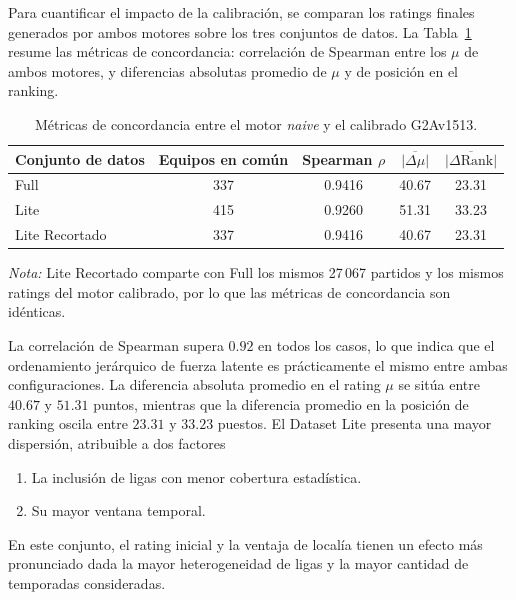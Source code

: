 Para cuantificar el impacto de la calibraci\'on, se comparan los ratings finales generados por ambos motores sobre los tres conjuntos de datos. La Tabla~\ref{tab:comparativa_concordancia_app} resume las m\'etricas de concordancia: correlaci\'on de Spearman entre los $\mu$ de ambos motores, y diferencias absolutas promedio de $\mu$ y de posici\'on en el ranking.

\begin{table}[htbp]
	\centering
	\caption{M\'etricas de concordancia entre el motor \textit{naive} y el calibrado G2Av1513.}
	\label{tab:comparativa_concordancia_app}
	\begin{tabular}{lcccc}
		\toprule
		\textbf{Conjunto de datos} & \textbf{Equipos en com\'un} & \textbf{Spearman $\rho$} & \textbf{$\overline{|\Delta \mu|}$} & \textbf{$\overline{|\Delta \text{Rank}|}$} \\
		\midrule
		Full & 337 & 0.9416 & 40.67 & 23.31 \\
		Lite & 415 & 0.9260 & 51.31 & 33.23 \\
		Lite Recortado & 337 & 0.9416 & 40.67 & 23.31 \\
		\bottomrule
	\end{tabular}
	\newline
	{\small \textit{Nota:} Lite Recortado comparte con Full los mismos 27\,067 partidos y los mismos ratings del motor calibrado, por lo que las m\'etricas de concordancia son id\'enticas.}
\end{table}

La correlaci\'on de Spearman supera $0.92$ en todos los casos, lo que indica que el ordenamiento jer\'arquico de fuerza latente es pr\'acticamente el mismo entre ambas configuraciones. La diferencia absoluta promedio en el rating $\mu$ se sit\'ua entre $40{.}67$ y $51{.}31$ puntos, mientras que la diferencia promedio en la posici\'on de ranking oscila entre $23{.}31$ y $33{.}23$ puestos. El Dataset Lite presenta una mayor dispersi\'on, atribuible a dos factores

\begin{enumerate}
	\item La inclusi\'on de ligas con menor cobertura estad\'istica.
	\item Su mayor ventana temporal.
\end{enumerate}

En este conjunto, el rating inicial y la ventaja de local\'ia tienen un efecto m\'as pronunciado dada la mayor heterogeneidad de ligas y la mayor cantidad de temporadas consideradas.

